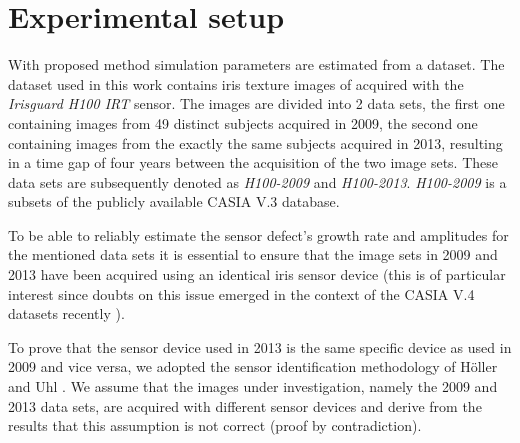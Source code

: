 \documentclass[10pt,twocolumn,letterpaper]{article}
\begin{document}

\section{Experimental setup}
 \label{testing}
 With proposed method simulation parameters are estimated from a dataset. The dataset used in this work contains iris texture images of acquired with the \emph{Irisguard H100 IRT} sensor. The images are divided into 2 data sets, the first one containing images from 49 distinct subjects acquired in 2009, the second one containing images from the exactly the same subjects acquired in 2013, resulting in a time gap of four years between the acquisition of the two image sets. These data sets are subsequently denoted as \emph{H100-2009} and \emph{H100-2013}. \emph{H100-2009} is a subsets of the publicly available CASIA V.3 database.

To be able to reliably estimate the sensor defect's growth rate and amplitudes for the mentioned data sets it is essential to ensure that the image sets in 2009 and 2013 have been acquired using an identical iris sensor device (this is of particular interest since doubts on this issue emerged in the context of the CASIA V.4 datasets recently \cite{Debiasi14a}). 

To prove that the sensor device used in 2013 is the same specific device as used in 2009 and vice versa, we adopted the sensor identification methodology of H\"oller and Uhl \cite{UhlH12}. 
We assume that the images under investigation, namely the 2009 and 2013 data sets, are acquired with different sensor devices and derive from the results that this assumption is not correct (proof by contradiction).
\end{document}
